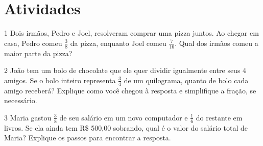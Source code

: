 \section*{Atividades}

\num{1}  Dois irmãos, Pedro e Joel, resolveram comprar uma pizza juntos. Ao
chegar em casa, Pedro comeu $\frac{3}{8}$ da pizza, enquanto Joel comeu $\frac{7}{16}$.
Qual dos irmãos comeu a maior parte da pizza?


\num{2}  João tem um bolo de chocolate que ele quer dividir igualmente entre seus 4 amigos. 
Se o bolo inteiro representa $\frac{3}{4}$ de um quilograma, quanto de bolo cada amigo 
receberá? Explique como você chegou à resposta e simplifique a fração, se necessário.

\begin{emptybox}




\end{emptybox}

\enlargethispage{2\baselineskip}
\num{3} Maria gastou $\frac{3}{8}$ de seu salário em um novo computador 
e $\frac{1}{6}$ do restante em livros. Se ela ainda tem R\$ 500,00 sobrando,
qual é o valor do salário total de Maria? Explique os passos para encontrar a resposta.


